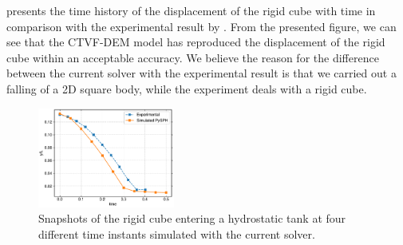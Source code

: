  presents the time history of the
displacement of the rigid cube with time in comparison with the experimental
result by \textcite{wu_two-way_2014}. From the presented figure, we can see that the
CTVF-DEM model has reproduced the displacement of the rigid cube within an
acceptable accuracy. We believe the reason for the difference between the
current solver with the experimental result is that we carried out a falling of
a 2D square body, while the experiment deals with a rigid cube.
\begin{figure}[!htpb]
  \centering
  \includegraphics[width=0.4\textwidth]{figures/rfc/figures/qiu_2017_falling_solid_in_water_2d/y_cm_vs_time}
  \caption{Snapshots of the rigid cube entering a hydrostatic tank at four
    different time instants simulated with the current solver.}
\label{fig:disp-falling-solid-in-water}
\end{figure}






